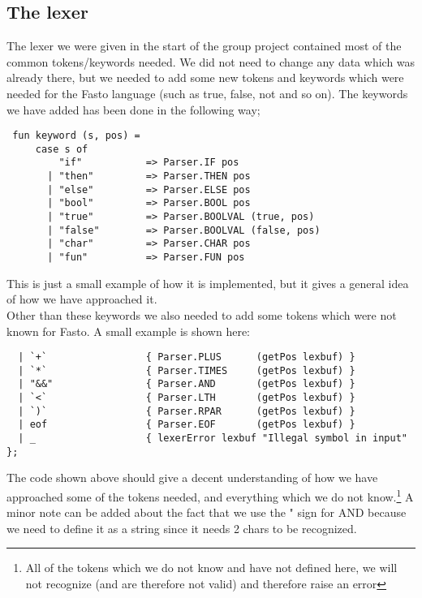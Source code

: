 \documentclass[12pt]{article}
\begin{document}
\subsection{The lexer}
The lexer we were given in the start of the group project contained most of the common tokens/keywords needed. We did not need to change any data which was already there, but we needed to add some new tokens and keywords which were needed for the Fasto language (such as true, false, not and so on). The keywords we have added has been done in the following way;\\
\begin{verbatim}
 fun keyword (s, pos) =
     case s of
         "if"           => Parser.IF pos
       | "then"         => Parser.THEN pos
       | "else"         => Parser.ELSE pos
       | "bool"         => Parser.BOOL pos
       | "true"         => Parser.BOOLVAL (true, pos)
       | "false"        => Parser.BOOLVAL (false, pos)
       | "char"         => Parser.CHAR pos
       | "fun"          => Parser.FUN pos
\end{verbatim}
This is just a small example of how it is implemented, but it gives a general idea of how we have approached it. \\
Other than these keywords we also needed to add some tokens which were not known for Fasto. A small example is shown here:
\begin{verbatim}
  | `+`                 { Parser.PLUS      (getPos lexbuf) }
  | `*`                 { Parser.TIMES     (getPos lexbuf) }
  | "&&"                { Parser.AND       (getPos lexbuf) }
  | `<`                 { Parser.LTH       (getPos lexbuf) }
  | `)`                 { Parser.RPAR      (getPos lexbuf) }
  | eof                 { Parser.EOF       (getPos lexbuf) }
  | _                   { lexerError lexbuf "Illegal symbol in input" };
\end{verbatim}
The code shown above should give a decent understanding of how we have approached some of the tokens needed, and everything which we do not know.\footnote{All of the tokens which we do not know and have not defined here, we will not recognize (and are therefore not valid) and therefore raise an error} A minor note can be added about the fact that we use the " sign for AND because we need to define it as a string since it needs 2 chars to be recognized.
\end{document}
